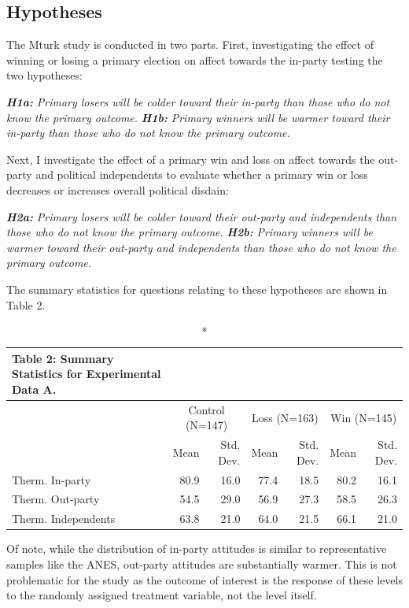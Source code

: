 \documentclass[
]{article}
\begin{document}
\hypertarget{hypotheses}{%
\subsection{Hypotheses}\label{hypotheses}}

The Mturk study is conducted in two parts. First, investigating the effect of winning or losing a primary election on affect towards the in-party testing the two hypotheses:

\textbf{\emph{H1a:}} \emph{Primary losers will be colder toward their in-party than those who do not know the primary outcome.}
\textbf{\emph{H1b:}} \emph{Primary winners will be warmer toward their in-party than those who do not know the primary outcome.}

Next, I investigate the effect of a primary win and loss on affect towards the out-party and political independents to evaluate whether a primary win or loss decreases or increases overall political disdain:

\textbf{\emph{H2a:}} \emph{Primary losers will be colder toward their out-party and independents than those who do not know the primary outcome.}
\textbf{\emph{H2b:}} \emph{Primary winners will be warmer toward their out-party and independents than those who do not know the primary outcome.}

The summary statistics for questions relating to these hypotheses are shown in Table 2.

\captionsetup[table]{labelformat=empty,skip=1pt}
\begin{longtable}{lrrrrrr}
\caption*{
{\large \textbf{Table 2:} Summary Statistics for Experimental Data A.}
} \\ 
\toprule
 & \multicolumn{2}{c}{Control (N=147)} & \multicolumn{2}{c}{Loss (N=163)} & \multicolumn{2}{c}{Win (N=145)} \\ 
 \cmidrule(lr){2-3} \cmidrule(lr){4-5} \cmidrule(lr){6-7}
  & Mean & Std. Dev. & Mean  & Std. Dev.  & Mean   & Std. Dev.   \\ 
\midrule
Therm. In-party & 80.9 & 16.0 & 77.4 & 18.5 & 80.2 & 16.1 \\ 
Therm. Out-party & 54.5 & 29.0 & 56.9 & 27.3 & 58.5 & 26.3 \\ 
Therm. Independents & 63.8 & 21.0 & 64.0 & 21.5 & 66.1 & 21.0 \\ 
 \bottomrule
\end{longtable}

Of note, while the distribution of in-party attitudes is similar to representative samples like the ANES, out-party attitudes are substantially warmer. This is not problematic for the study as the outcome of interest is the response of these levels to the randomly assigned treatment variable, not the level itself.
\end{document}
